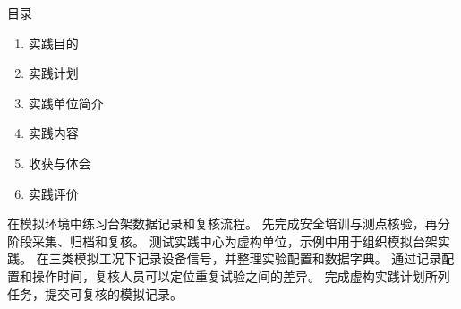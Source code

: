 \documentclass{sdjumpracticereport}
\author{测试研究生甲}
\begin{document}
\makecover

{\centering{}目录\par}
\bigskip
\begin{enumerate}
\renewcommand\labelenumi{\chinese{enumi}、}
\setlength\itemsep{11bp}
\bfseries
\item 实践目的
\item 实践计划
\item 实践单位简介
\item 实践内容
\item 收获与体会
\item 实践评价
\end{enumerate}

\clearpage
{}
在模拟环境中练习台架数据记录和复核流程。
先完成安全培训与测点核验，再分阶段采集、归档和复核。
测试实践中心为虚构单位，示例中用于组织模拟台架实践。
在三类模拟工况下记录设备信号，并整理实验配置和数据字典。
通过记录配置和操作时间，复核人员可以定位重复试验之间的差异。
完成虚构实践计划所列任务，提交可复核的模拟记录。
\end{document}
